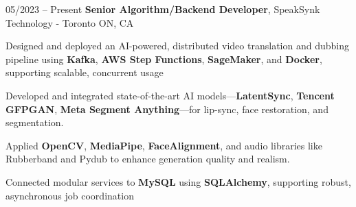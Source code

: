 \begin{twocolentry}{
    05/2023 – Present
}
\fontsize{11 pt}{11 pt}\textbf{Senior Algorithm/Backend Developer}, SpeakSynk Technology - Toronto ON, CA\end{twocolentry}

\vspace{0.10 cm}
\begin{onecolentry}
    \begin{highlights}
        \item Designed and deployed an AI-powered, distributed video translation and dubbing pipeline using \textbf{Kafka}, \newline \textbf{AWS Step Functions}, \textbf{SageMaker}, and \textbf{Docker}, supporting scalable, concurrent usage
        \item Developed and integrated state-of-the-art AI models—\textbf{LatentSync}, \textbf{Tencent GFPGAN}, \textbf{Meta Segment Anything}—for lip-sync, face restoration, and segmentation.
        \item Applied \textbf{OpenCV}, \textbf{MediaPipe}, \textbf{FaceAlignment}, and audio libraries like Rubberband and Pydub to enhance generation quality and realism.
        \item Connected modular services to \textbf{MySQL} using \textbf{SQLAlchemy}, supporting robust, asynchronous job coordination
    \end{highlights}
\end{onecolentry}
